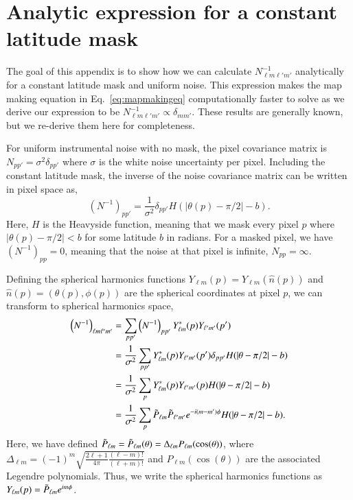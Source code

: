 \documentclass[twocolumn]{../common/aa}
\begin{document}






\appendix

\section{Analytic expression for a constant latitude mask}
\label{sec:appendixA}


The goal of this appendix is to show how we can calculate $N_{\ell m \ell' m'}^{-1}$ analytically for a constant latitude mask and uniform noise. This expression makes the map making equation in Eq.~\eqref{eq:mapmakingeq} computationally faster to solve as we derive our expression to be $N_{\ell m \ell' m'}^{-1} \propto \delta_{mm'}$. These results are generally known, but we re-derive them here for completeness.

For uniform instrumental noise with no mask, the pixel covariance matrix is $N_{pp'} = \sigma^2 \delta_{pp'}$ where $\sigma$ is the white noise uncertainty per pixel. Including the constant latitude mask, the inverse of the noise covariance matrix can be written in pixel space as,
$$
\left(N^{-1} \right)_{pp'} = \frac{1}{\sigma^2} \delta_{pp'} H(|\theta(p) -\pi/2|-b).
$$
Here, $H$ is the Heavyside function, meaning that we mask every pixel $p$ where $|\theta(p) -\pi/2| < b$ for some latitude $b$ in radians. For a masked pixel, we have $\left(N^{-1} \right)_{pp}=0$, meaning that the noise at that pixel is infinite, $N_{pp} = \infty$.

Defining the spherical harmonics functions $Y_{\ell m}\left(p\right) = Y_{\ell m}\left(\hat{n}(p)\right)$ and $\hat{n}(p) = (\theta(p), \phi(p))$ are the spherical coordinates at pixel $p$, we can transform to spherical harmonics space,
\begin{align}
\nonumber
\left(N^{-1}\right)_{\ell m \ell' m'} &= \sum_{p p'}\left(N^{-1}\right)_{pp'}Y^{*}_{\ell m}(p)Y_{\ell' m'}(p')\\
\nonumber
&= \frac{1}{\sigma^2}\sum_{p p'} Y^{*}_{\ell m}(p)Y_{\ell' m'}(p') \delta_{pp'} H(|\theta -\pi/2|-b)\\
\nonumber
&= \frac{1}{\sigma^2}\sum_{p } Y^{*}_{\ell m}(p)Y_{\ell' m'}(p) H(|\theta -\pi/2|-b)\\
&= \frac{1}{\sigma^2}\sum_p \Tilde{P}_{\ell m}\Tilde{P}_{\ell' m'} e^{-i(m-m')\phi} H(|\theta -\pi/2|-b).
\end{align}
Here, we have defined $\Tilde{P}_{\ell m}=\Tilde{P}_{\ell m}(\theta) = \Delta_{\ell m}P_{\ell m}(\cos(\theta))$, where ${\Delta_{\ell m}=(-1)^m \sqrt{\frac{2\ell+1}{4\pi}\frac{(\ell - m)!}{(\ell+m)!}}}$ and $P_{\ell m}(\cos(\theta))$ are the associated Legendre polynomials. Thus, we write the spherical harmonics functions as $Y_{\ell m}(p) = \Tilde{P}_{\ell m} e^{im\phi}$.
\end{document}
